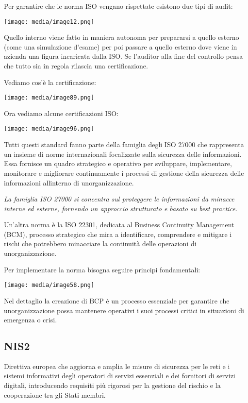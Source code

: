 Per garantire che le norma ISO vengano rispettate esistono due tipi di
audit:

\texttt{[image: media/image12.png]}

Quello interno viene fatto in maniera autonoma per prepararsi a quello
esterno (come una simulazione d'esame) per poi passare a quello esterno
dove viene in azienda una figura incaricata dalla ISO. Se l'auditor alla
fine del controllo pensa che tutto sia in regola rilascia una
certificazione.

Vediamo cos'è la certificazione:

\texttt{[image: media/image89.png]}

Ora vediamo alcune certificazioni ISO:

\texttt{[image: media/image96.png]}

Tutti questi standard fanno parte della famiglia degli ISO 27000 che
rappresenta un insieme di norme internazionali focalizzate sulla
sicurezza delle informazioni. Essa fornisce un quadro strategico e
operativo per sviluppare, implementare, monitorare e migliorare
continuamente i processi di gestione della sicurezza delle informazioni
all\textquotesingle interno di un\textquotesingle organizzazione.

\emph{La famiglia ISO 27000 si concentra sul proteggere le informazioni
da minacce interne ed esterne, fornendo un approccio strutturato e
basato su best practice.}

Un'altra norma è la ISO 22301, dedicata al Business Continuity
Management (BCM), processo strategico che mira a identificare,
comprendere e mitigare i rischi che potrebbero minacciare la continuità
delle operazioni di un\textquotesingle organizzazione.

Per implementare la norma bisogna seguire principi fondamentali:

\texttt{[image: media/image58.png]}

Nel dettaglio la creazione di BCP è un processo essenziale per garantire
che un\textquotesingle organizzazione possa mantenere operativi i suoi
processi critici in situazioni di emergenza o crisi.

\subsection{NIS2}\label{nis2}

Direttiva europea che aggiorna e amplia le misure di sicurezza per le
reti e i sistemi informativi degli operatori di servizi essenziali e dei
fornitori di servizi digitali, introducendo requisiti più rigorosi per
la gestione del rischio e la cooperazione tra gli Stati membri.

